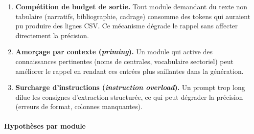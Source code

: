 \begin{enumerate}
\item \textbf{Compétition de budget de sortie.} Tout module demandant du texte
  non tabulaire (narratifs, bibliographie, cadrage) consomme des tokens qui
  auraient pu produire des lignes CSV. Ce mécanisme dégrade le rappel sans
  affecter directement la précision.
\item \textbf{Amorçage par contexte (\emph{priming}).} Un module qui active
  des connaissances pertinentes (noms de centrales, vocabulaire sectoriel) peut
  améliorer le rappel en rendant ces entrées plus saillantes dans la génération.
\item \textbf{Surcharge d'instructions (\emph{instruction overload}).} Un
  prompt trop long dilue les consignes d'extraction structurée, ce qui peut
  dégrader la précision (erreurs de format, colonnes manquantes).
\end{enumerate}

\paragraph{Hypothèses par module}

